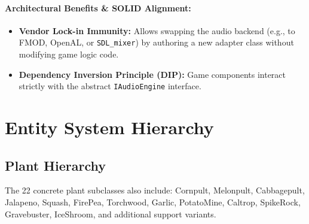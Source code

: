 \documentclass[12pt,a4paper]{article}
\begin{document}
\paragraph{Architectural Benefits \& SOLID Alignment:}
\begin{itemize}
    \item \textbf{Vendor Lock-in Immunity:} Allows swapping the audio backend (e.g., to FMOD, OpenAL, or \texttt{SDL\_mixer}) by authoring a new adapter class without modifying game logic code.
    \item \textbf{Dependency Inversion Principle (DIP):} Game components interact strictly with the abstract \texttt{IAudioEngine} interface.
\end{itemize}


\section{Entity System Hierarchy}
\subsection{Plant Hierarchy}
\begin{center}
\end{center}

\noindent The 22 concrete plant subclasses also include: Cornpult, Melonpult, Cabbagepult, Jalapeno, Squash, FirePea, Torchwood, Garlic, PotatoMine, Caltrop, SpikeRock, Gravebuster, IceShroom, and additional support variants.
\end{document}
